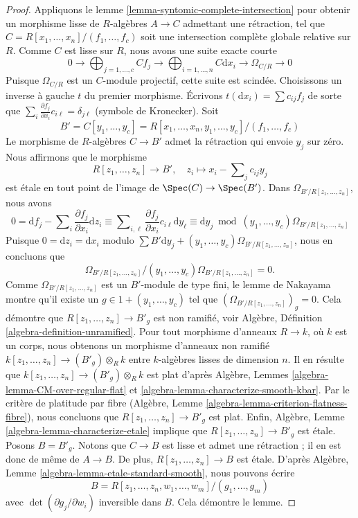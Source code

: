 \begin{proof}
Appliquons le lemme \ref{lemma-syntomic-complete-intersection} pour obtenir un
morphisme lisse de $R$-algèbres $A \to C$ admettant une rétraction, tel que
$C = R[x_1, \ldots, x_n]/(f_1, \ldots, f_c)$ soit une intersection complète
globale relative sur $R$. Comme $C$ est lisse sur $R$, nous avons une suite
exacte courte
$$
0 \to
\bigoplus\nolimits_{j = 1, \ldots, c} C f_j \to
\bigoplus\nolimits_{i = 1, \ldots, n} C\text{d}x_i \to
\Omega_{C/R} \to 0
$$
Puisque $\Omega_{C/R}$ est un $C$-module projectif, cette suite est scindée.
Choisissons un inverse à gauche $t$ du premier morphisme. Écrivons
$t(\text{d}x_i) = \sum c_{ij} f_j$
de sorte que $\sum_i \frac{\partial f_j}{\partial x_i} c_{i\ell} = \delta_{j\ell}$
(symbole de Kronecker). Soit
$$
B' = C[y_1, \ldots, y_c] =
R[x_1, \ldots, x_n, y_1, \ldots, y_c]/(f_1, \ldots, f_c)
$$
Le morphisme de $R$-algèbres $C \to B'$ admet la rétraction qui envoie $y_j$
sur zéro. Nous affirmons que le morphisme
$$
R[z_1, \ldots, z_n] \longrightarrow B',\quad
z_i \longmapsto x_i - \sum\nolimits_j c_{ij} y_j
$$
est \'etale en tout point de l'image de $\Spec(C) \to \Spec(B')$.
Dans $\Omega_{B'/R[z_1, \ldots, z_n]}$, nous avons
$$
0 =
\text{d}f_j - \sum\nolimits_i \frac{\partial f_j}{\partial x_i} \text{d}z_i
\equiv
\sum\nolimits_{i, \ell}
\frac{\partial f_j}{\partial x_i} c_{i\ell} \text{d}y_\ell
\equiv
\text{d}y_j \bmod (y_1, \ldots, y_c)\Omega_{B'/R[z_1, \ldots, z_n]}
$$
Puisque $0 = \text{d}z_i = \text{d}x_i$ modulo
$\sum B'\text{d}y_j + (y_1, \ldots, y_c)\Omega_{B'/R[z_1, \ldots, z_n]}$,
nous en concluons que
$$
\Omega_{B'/R[z_1, \ldots, z_n]}/
(y_1, \ldots, y_c)\Omega_{B'/R[z_1, \ldots, z_n]} = 0.
$$
Comme $\Omega_{B'/R[z_1, \ldots, z_n]}$ est un $B'$-module de type fini, le
lemme de Nakayama montre qu'il existe un $g \in 1 + (y_1, \ldots, y_c)$ tel que
$(\Omega_{B'/R[z_1, \ldots, z_n]})_g = 0$. Cela démontre que
$R[z_1, \ldots, z_n] \to B'_g$ est non ramifié, voir
Algèbre, Définition \ref{algebra-definition-unramified}.
Pour tout morphisme d'anneaux $R \to k$, où $k$ est un corps, nous obtenons un
morphisme d'anneaux non ramifié
$k[z_1, \ldots, z_n] \to (B'_g) \otimes_R k$ entre $k$-algèbres lisses de
dimension $n$. Il en résulte que
$k[z_1, \ldots, z_n] \to (B'_g) \otimes_R k$ est plat d'après
Algèbre, Lemmes \ref{algebra-lemma-CM-over-regular-flat} et
\ref{algebra-lemma-characterize-smooth-kbar}. Par le crit\`ere
de platitude par fibre
(Algèbre, Lemme \ref{algebra-lemma-criterion-flatness-fibre}),
nous concluons que $R[z_1, \ldots, z_n] \to B'_g$ est plat.
Enfin, Algèbre, Lemme \ref{algebra-lemma-characterize-etale} implique que
$R[z_1, \ldots, z_n] \to B'_g$ est \'etale.
Posons $B = B'_g$. Notons que $C \to B$ est lisse et admet une rétraction ; il
en est donc de même de $A \to B$. De plus,
$R[z_1, \ldots, z_n] \to B$ est \'etale.
D'après Algèbre, Lemme \ref{algebra-lemma-etale-standard-smooth}, nous pouvons
écrire
$$
B = R[z_1, \ldots, z_n, w_1, \ldots, w_m]/(g_1, \ldots, g_m)
$$
avec $\det(\partial g_j/\partial w_i)$ inversible dans $B$.
Cela démontre le lemme.
\end{proof}

